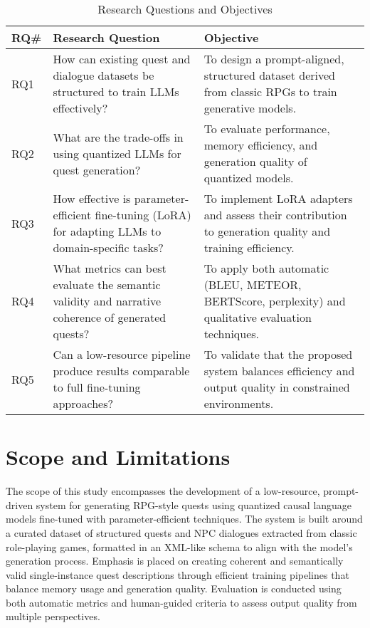 \noindent
\begin{table}[H]
  \centering
  \scriptsize
  \renewcommand{\arraystretch}{1.3}
  \begin{tabularx}{0.95\textwidth}{
    >{\centering\arraybackslash}p{1cm}
    >{\raggedright\arraybackslash}X
    >{\raggedright\arraybackslash}X
  }
  \toprule
  \textbf{RQ\#} & \textbf{Research Question} & \textbf{Objective} \\
  \midrule
  RQ1
    & How can existing quest and dialogue datasets be structured to train LLMs effectively?
    & To design a prompt-aligned, structured dataset derived from classic RPGs to train generative models. \\
  RQ2
    & What are the trade-offs in using quantized LLMs for quest generation?
    & To evaluate performance, memory efficiency, and generation quality of quantized models. \\
  RQ3
    & How effective is parameter-efficient fine-tuning (LoRA) for adapting LLMs to domain-specific tasks?
    & To implement LoRA adapters and assess their contribution to generation quality and training efficiency. \\
  RQ4
    & What metrics can best evaluate the semantic validity and narrative coherence of generated quests?
    & To apply both automatic (BLEU, METEOR, BERTScore, perplexity) and qualitative evaluation techniques. \\
  RQ5
    & Can a low-resource pipeline produce results comparable to full fine-tuning approaches?
    & To validate that the proposed system balances efficiency and output quality in constrained environments. \\
  \bottomrule
  \end{tabularx}
  \caption{Research Questions and Objectives}
\end{table}

\section{Scope and Limitations}

The scope of this study encompasses the development of a low-resource, prompt-driven
system for generating RPG-style quests using quantized causal language models fine-tuned
with parameter-efficient techniques. The system is built around a curated dataset
of structured quests and NPC dialogues extracted from classic role-playing games, formatted
in an XML-like schema to align with the model's generation process. Emphasis is
placed on creating coherent and semantically valid single-instance quest descriptions through efficient
training pipelines that balance memory usage and generation quality. Evaluation is
conducted using both automatic metrics and human-guided criteria to assess output quality
from multiple perspectives.

